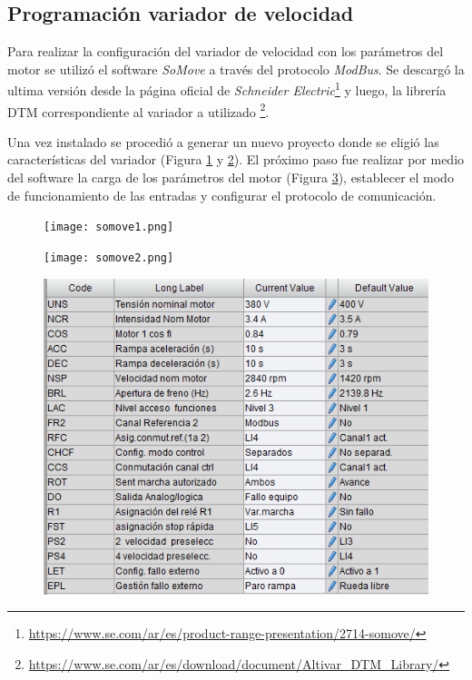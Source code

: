 
\subsection{Programación variador de velocidad}


Para realizar la configuración del variador de velocidad con los parámetros del motor se utilizó el software \textit{SoMove} a través del protocolo \textit{ModBus}. Se descargó la ultima versión desde la página oficial de \textit{Schneider Electric}\footnote{\url{https://www.se.com/ar/es/product-range-presentation/2714-somove/}} y luego, la librería DTM correspondiente al variador a utilizado \footnote{\url{https://www.se.com/ar/es/download/document/Altivar_DTM_Library/}}.

Una vez instalado se procedió a generar un nuevo proyecto donde se eligió las características del variador (Figura \ref{fig:so1} y \ref{fig:so2}). El próximo paso fue realizar por medio del software la carga de los parámetros del motor (Figura \ref{fig:paramsomove}), establecer el modo de funcionamiento de las entradas y configurar el protocolo de comunicación.
\begin{figure}[h!]
	\centering
	\texttt{[image: somove1.png]}
	\label{fig:so1}
\end{figure}
\begin{figure}[h!]
	\centering
	\texttt{[image: somove2.png]}
	\label{fig:so2}
\end{figure}

\begin{figure}[h!]
	\centering
	\includegraphics[width=0.7\linewidth]{images/paramsomove}
	\label{fig:paramsomove}
\end{figure}


